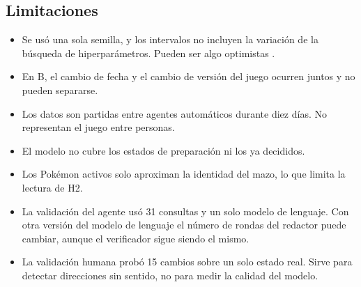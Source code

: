 \subsection{Limitaciones}
\label{subsec:limitaciones}

\begin{itemize}
  \item Se usó una sola semilla, y los intervalos no incluyen la
        variación de la búsqueda de hiperparámetros. Pueden ser algo
        optimistas \cite{brill_winprob_2026}.
  \item En B, el cambio de fecha y el cambio de versión del juego ocurren
        juntos y no pueden separarse.
  \item Los datos son partidas entre agentes automáticos durante diez
        días. No representan el juego entre personas.
  \item El modelo no cubre los estados de preparación ni los ya decididos.
  \item Los Pok\'emon activos solo aproximan la identidad del mazo, lo que
        limita la lectura de H2.
  \item La validación del agente usó 31 consultas y un solo modelo de
        lenguaje. Con otra versión del modelo de lenguaje el número de
        rondas del redactor puede cambiar, aunque el verificador sigue
        siendo el mismo.
  \item La validación humana probó 15 cambios sobre un solo estado real.
        Sirve para detectar direcciones sin sentido, no para medir la
        calidad del modelo.
\end{itemize}

